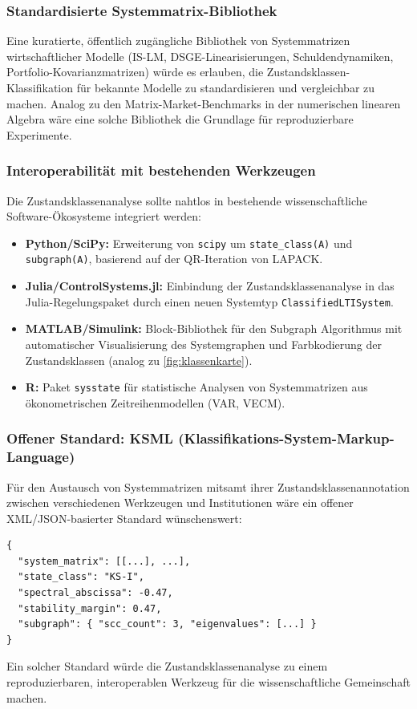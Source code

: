 ﻿\documentclass[12pt, a4paper, titlepage]{report}
\theoremstyle{definition}
\theoremstyle{remark}
\begin{document}
\subsubsection*{Standardisierte Systemmatrix-Bibliothek}

Eine kuratierte, öffentlich zugängliche Bibliothek von Systemmatrizen
wirtschaftlicher Modelle (IS-LM, DSGE-Linearisierungen, Schuldendynamiken,
Portfolio-Kovarianzmatrizen) würde es erlauben, die Zustandsklassen-Klassifikation
für bekannte Modelle zu standardisieren und vergleichbar zu machen.
Analog zu den Matrix-Market-Benchmarks in der numerischen linearen Algebra
wäre eine solche Bibliothek die Grundlage für reproduzierbare Experimente.

\subsubsection*{Interoperabilität mit bestehenden Werkzeugen}

Die Zustands\-klassen\-analyse sollte nahtlos in bestehende wissenschaftliche
Software-Öko\-systeme integriert werden:
\begin{itemize}
  \item \textbf{Python/SciPy:} Erweiterung von \texttt{scipy} um
    \texttt{state\_class(A)} und \texttt{subgraph(A)},
    basierend auf der QR-Iteration von LAPACK.
  \item \textbf{Julia/ControlSystems.jl:} Einbindung der Zustandsklassenanalyse
    in das Julia-Regelungspaket durch einen neuen Systemtyp \texttt{ClassifiedLTISystem}.
  \item \textbf{MATLAB/Simulink:} Block-Bibliothek für den Subgraph Algorithmus
    mit automatischer Visualisierung des Systemgraphen und Farbkodierung
    der Zustandsklassen (analog zu \cref{fig:klassenkarte}).
  \item \textbf{R:} Paket \texttt{sysstate} für statistische Analysen von
    Systemmatrizen aus ökonometrischen Zeitreihenmodellen (VAR, VECM).
\end{itemize}

\subsubsection*{Offener Standard: KSML (Klassifikations-System-Markup-Language)}

Für den Austausch von Systemmatrizen mitsamt ihrer Zustandsklassenannotation
zwischen verschiedenen Werkzeugen und Institutionen wäre ein offener
XML/JSON-basierter Standard wünschenswert:
\begin{verbatim}
{
  "system_matrix": [[...], ...],
  "state_class": "KS-I",
  "spectral_abscissa": -0.47,
  "stability_margin": 0.47,
  "subgraph": { "scc_count": 3, "eigenvalues": [...] }
}
\end{verbatim}
Ein solcher Standard würde die Zustandsklassenanalyse zu einem reproduzierbaren,
interoperablen Werkzeug für die wissenschaftliche Gemeinschaft machen.
\end{document}

